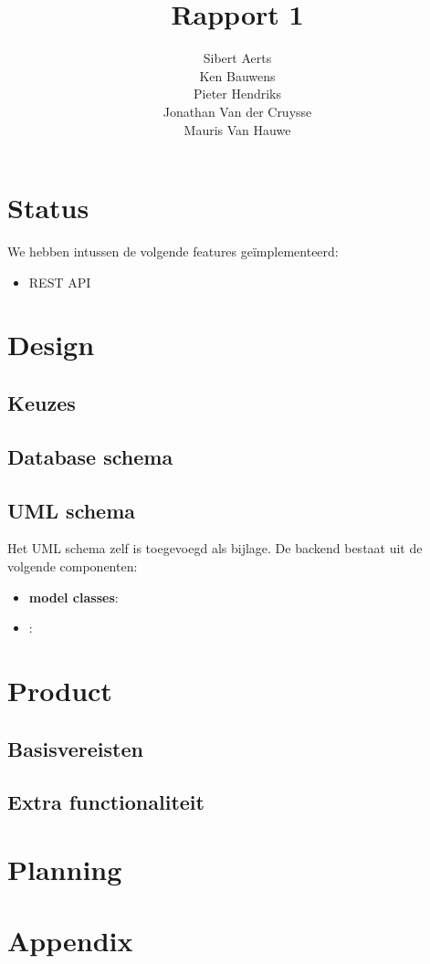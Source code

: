 \documentclass[12pt,a4paper]{article}
\begin{document}
\title{Rapport 1}
\author{Sibert Aerts \\ Ken Bauwens \\ Pieter Hendriks \\ Jonathan Van der Cruysse \\ Mauris Van Hauwe}
\maketitle

\newcommand{\code}[1]{\texttt{#1}}

\section{Status}

We hebben intussen de volgende features ge\"implementeerd:

\begin{itemize}

\item REST API

\end{itemize}

\section{Design}

\subsection{Keuzes}

\subsection{Database schema}

\subsection{UML schema}

Het UML schema zelf is toegevoegd als bijlage. De backend bestaat uit de volgende componenten:

\begin{itemize}

\item \textbf{model classes}:  

\item \textbf{}:

\end{itemize}

\section{Product}

\subsection{Basisvereisten}

\subsection{Extra functionaliteit}

\section{Planning}

\section{Appendix}
\end{document}
